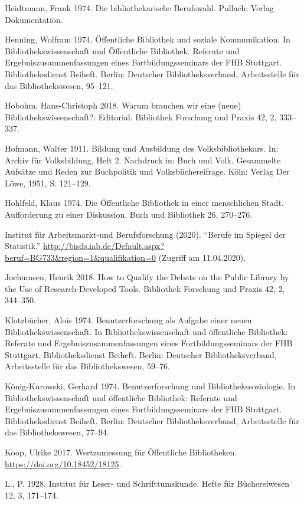\documentclass[a4paper,
fontsize=11pt,
oneside,
numbers=noperiodatend,
parskip=half-,
bibliography=totoc,
final
]{scrartcl}
\begin{document}
Heidtmann, Frank 1974. Die bibliothekarische Berufswahl. Pullach: Verlag
Dokumentation.

Henning, Wolfram 1974. Öffentliche Bibliothek und soziale Kommunikation.
In Bibliothekswissenschaft und Öffentliche Bibliothek. Referate und
Ergebniszusammenfassungen eines Fortbildungsseminars der FHB Stuttgart.
Bibliotheksdienst Beiheft. Berlin: Deutscher Bibliotheksverband,
Arbeitsstelle für das Bibliothekswesen, 95--121.

Hobohm, Hans-Christoph 2018. Warum brauchen wir eine (neue)
Bibliothekswissenschaft?: Editorial. Bibliothek Forschung und Praxis 42,
2, 333--337.

Hofmann, Walter 1911. Bildung und Ausbildung des Volksbibliothekars. In:
Archiv für Volksbildung, Heft 2. Nachdruck in: Buch und Volk. Gesammelte
Aufsätze und Reden zur Buchpolitik und Volksbüchereifrage. Köln: Verlag
Der Löwe, 1951, S. 121--129.

Hohlfeld, Klaus 1974. Die Öffentliche Bibliothek in einer menschlichen
Stadt. Aufforderung zu einer Diskussion. Buch und Bibliothek 26,
270--276.

Institut für Arbeitsmarkt-und Berufsforschung (2020). \enquote{Berufe im
Spiegel der Statistik.}
\url{http://bisds.iab.de/Default.aspx?beruf=BG733\&region=1\&qualifikation=0}
(Zugriff am 11.04.2020).

Jochumsen, Henrik 2018. How to Qualify the Debate on the Public Library
by the Use of Re\-search-Developed Tools. Bibliothek Forschung und Praxis
42, 2, 344--350.

Klotzbücher, Alois 1974. Benutzerforschung als Aufgabe einer neuen
Bibliothekswissenschaft. In Bibliothekswissenschaft und öffentliche
Bibliothek: Referate und Ergebniszusammenfassungen eines
Fortbildungsseminars der FHB Stuttgart. Bibliotheksdienst Beiheft.
Berlin: Deutscher Bibliotheksverband, Arbeitsstelle für das
Bibliothekswesen, 59--76.

König-Kurowski, Gerhard 1974. Benutzerforschung und
Bibliothekssoziologie. In Bibliothekswissenschaft und öffentliche
Bibliothek: Referate und Ergebniszusammenfassungen eines
Fortbildungsseminars der FHB Stuttgart. Bibliotheksdienst Beiheft.
Berlin: Deutscher Bibliotheksverband, Arbeitsstelle für das
Bibliothekswesen, 77--94.

Koop, Ulrike 2017. Wertzumessung für Öffentliche Bibliotheken.
\url{https://doi.org/10.18452/18125}.

L., P. 1928. Institut für Leser- und Schrifttumskunde. Hefte für
Büchereiwesen 12, 3, 171--174.
\end{document}

